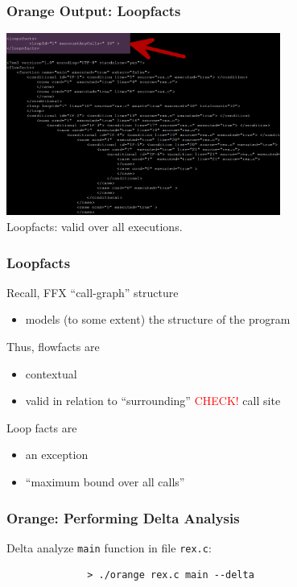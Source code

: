 \documentclass{beamer}
\begin{document}
\begin{frame}[fragile]
  \frametitle{Orange Output: Loopfacts}

  \begin{center}
    \includegraphics[width=9cm]{img/loopsfacts.pdf} \\
    Loopfacts: valid over all executions.
  \end{center}
\end{frame} 



\begin{frame}[fragile]
  \frametitle{Loopfacts}

  \medskip
  Recall, FFX ``call-graph'' structure
  \begin{itemize}
     \item models (to some extent) the structure of the program
  \end{itemize}

  \medskip
  Thus, flowfacts are 
  \begin{itemize}
    \item contextual
    \item valid in relation to ``surrounding'' \textcolor{red}{CHECK!} call site
  \end{itemize}

  \medskip
  Loop facts are
  \begin{itemize}
    \item an exception
    \item ``maximum bound over all calls''
  \end{itemize}
\end{frame} 



\begin{frame}[fragile]
  \frametitle{Orange: Performing Delta Analysis}

  \begin{centering}
    Delta analyze {\tt main} function in file {\tt rex.c}: \\
    {\small
    \begin{verbatim}
              > ./orange rex.c main --delta
    \end{verbatim}
    }
  \end{centering}
\end{frame} 
\end{document}

